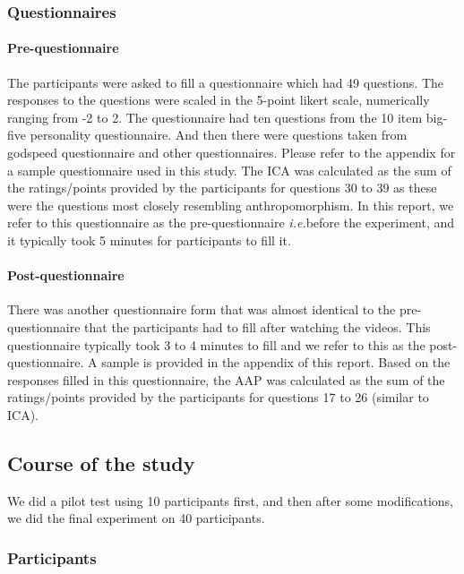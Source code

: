 \documentclass[a4,twocolumn,10pt]{article}
\newcommand{\ie}{{\textit{i.e.\xspace}}}
\begin{document}
\subsubsection{Questionnaires}

\paragraph{Pre-questionnaire}

The participants were asked to fill a questionnaire which had 49 questions. The
responses to the questions were scaled in the 5-point likert scale, numerically
ranging from -2 to 2. The questionnaire had ten questions from the 10 item
big-five personality questionnaire. And then there were questions taken from
godspeed questionnaire and other questionnaires. Please refer to the appendix
for a sample questionnaire used in this study. The ICA was calculated as the sum
of the ratings/points provided by the participants for questions 30 to 39 as
these were the questions most closely resembling anthropomorphism. In this
report, we refer to this questionnaire as the pre-questionnaire \ie before the
experiment, and it typically took 5 minutes for participants to fill it. 

\paragraph{Post-questionnaire}

There was another questionnaire form that was almost identical to the
pre-questionnaire that the participants had to fill after watching the videos.
This questionnaire typically took 3 to 4 minutes to fill and we refer to this as
the post-questionnaire. A sample is provided in the appendix of this report.
Based on the responses filled in this questionnaire, the AAP was calculated as
the sum of the ratings/points provided by the participants for questions 17 to
26 (similar to ICA).


\subsection{Course of the study}

We did a pilot test using 10 participants first, and then after some
modifications, we did the final experiment on 40 participants.

\subsubsection{Participants}
\end{document}
